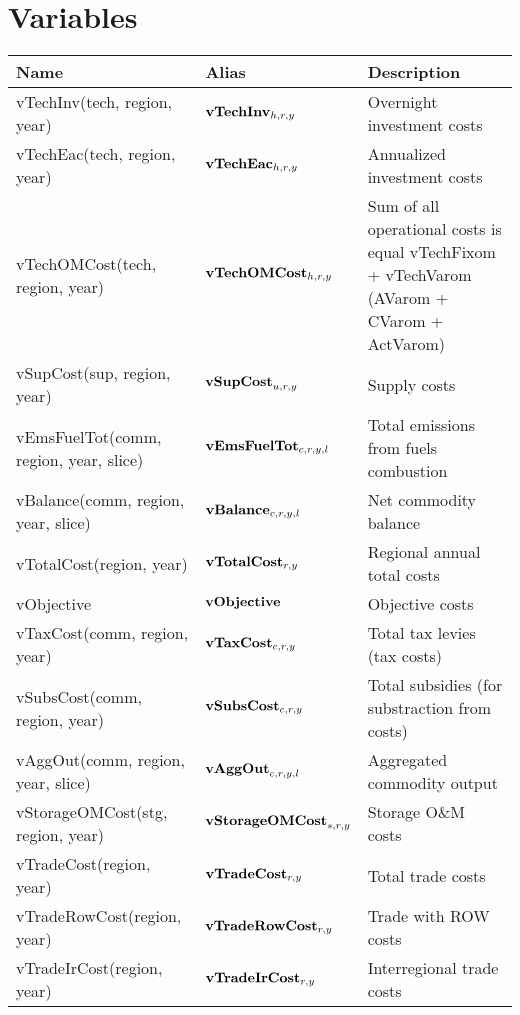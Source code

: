 \documentclass{article}
\begin{document}
\section*{Variables}
\begin{longtable}{|p{10cm}|p{5cm}|p{9cm}|}
\hline
\bf{Name} & \bf{Alias}   & \bf{Description} \\ 
 \hline
vTechInv(tech, region, year) & ${\bf vTechInv}_{h,r,y}$ & Overnight investment costs \\ 
 \hline
vTechEac(tech, region, year) & ${\bf vTechEac}_{h,r,y}$ & Annualized investment costs \\ 
 \hline
vTechOMCost(tech, region, year) & ${\bf vTechOMCost}_{h,r,y}$ & Sum of all operational costs is equal vTechFixom + vTechVarom (AVarom + CVarom + ActVarom) \\ 
 \hline
vSupCost(sup, region, year) & ${\bf vSupCost}_{u,r,y}$ & Supply costs \\ 
 \hline
vEmsFuelTot(comm, region, year, slice) & ${\bf vEmsFuelTot}_{c,r,y,l}$ & Total emissions from fuels combustion \\ 
 \hline
vBalance(comm, region, year, slice) & ${\bf vBalance}_{c,r,y,l}$ & Net commodity balance \\ 
 \hline
vTotalCost(region, year) & ${\bf vTotalCost}_{r,y}$ & Regional annual total costs \\ 
 \hline
vObjective & ${\bf vObjective}$ & Objective costs \\ 
 \hline
vTaxCost(comm, region, year) & ${\bf vTaxCost}_{c,r,y}$ & Total tax levies (tax costs) \\ 
 \hline
vSubsCost(comm, region, year) & ${\bf vSubsCost}_{c,r,y}$ & Total subsidies (for substraction from costs) \\ 
 \hline
vAggOut(comm, region, year, slice) & ${\bf vAggOut}_{c,r,y,l}$ & Aggregated commodity output \\ 
 \hline
vStorageOMCost(stg, region, year) & ${\bf vStorageOMCost}_{s,r,y}$ & Storage O\&M costs \\ 
 \hline
vTradeCost(region, year) & ${\bf vTradeCost}_{r,y}$ & Total trade costs \\ 
 \hline
vTradeRowCost(region, year) & ${\bf vTradeRowCost}_{r,y}$ & Trade with ROW costs \\ 
 \hline
vTradeIrCost(region, year) & ${\bf vTradeIrCost}_{r,y}$ & Interregional trade costs \\ 
 \hline
\end{longtable}
\end{document}
